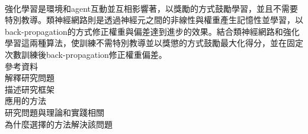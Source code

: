 \begin{flushleft}
{\large {}}\\
\end{flushleft}

強化學習是環境和agent互動並互相影響著，以獎勵的方式鼓勵學習，並且不需要特別教導。類神經網路則是透過神經元之間的非線性與權重產生記憶性並學習，以back-propagation的方式修正權重與偏差達到進步的效果。結合類神經網路和強化學習這兩種算法，使訓練不需特別教導並以獎懲的方式鼓勵最大化得分，並在固定次數訓練後back-propagation修正權重偏差。\\

參考資料\\

解釋研究問題\\

描述研究框架\\

應用的方法\\

研究問題與理論和實踐相關\\

為什麼選擇的方法解決該問題\\

